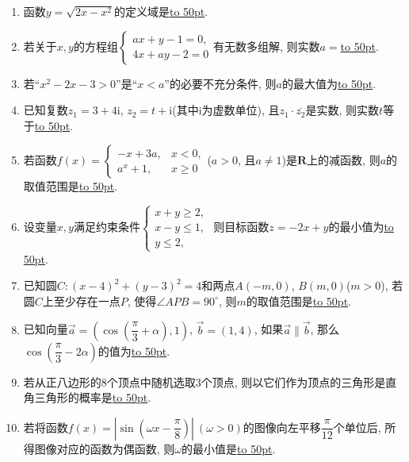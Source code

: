 \documentclass[10pt,a4paper]{article}
\newcommand{\blank}[1]{\underline{\hbox to #1pt{}}}
\begin{document}
\begin{enumerate}[1.]

\item 函数$y=\sqrt{2x-x^2}$的定义域是\blank{50}.
\item 若关于$x,y$的方程组$\begin{cases} ax+y-1=0,  \\ 4x+ay-2=0  \end{cases}$有无数多组解, 则实数$a=$\blank{50}.
\item 若``$x^2-2x-3>0$''是``$x<a$''的必要不充分条件, 则$a$的最大值为\blank{50}.
\item 已知复数$z_1=3+4\mathrm{i}$, $z_2=t+\mathrm{i}$(其中$\mathrm{i}$为虚数单位), 且$z_1\cdot \overline{z_2}$是实数, 则实数$t$等于\blank{50}.
\item 若函数$f(x)=\begin{cases} -x+3a, & x<0,  \\ a^x+1, & x\ge 0 \end{cases}$($a>0$, 且$a\ne 1$)是$\mathbf{R}$上的减函数, 则$a$的取值范围是\blank{50}.
\item 设变量$x,y$满足约束条件$\begin{cases} x+y\ge 2, \\ x-y\le 1, \\ y\le 2,\end{cases}$ 则目标函数$z=-2x+y$的最小值为\blank{50}.
\item 已知圆$C:(x-4)^2+(y-3)^2=4$和两点$A(-m,0)$, $B(m,0)$($m>0$), 若圆$C$上至少存在一点$P$, 使得$\angle APB=90^\circ $, 则$m$的取值范围是\blank{50}.
\item 已知向量$\overrightarrow a=(\cos(\dfrac{\pi}3+\alpha),1)$, $\overrightarrow b=(1,4)$, 如果$\overrightarrow a \parallel \overrightarrow b$, 那么$\cos(\dfrac{\pi}3-2\alpha)$的值为\blank{50}.
\item 若从正八边形的$8$个顶点中随机选取$3$个顶点, 则以它们作为顶点的三角形是直角三角形的概率是\blank{50}.
\item 若将函数$f(x)=|\sin(\omega x-\dfrac{\pi}8)| \ (\omega >0)$的图像向左平移$\dfrac{\pi}{12}$个单位后, 所得图像对应的函数为偶函数, 则$\omega$的最小值是\blank{50}.



\end{enumerate}
\end{document}

